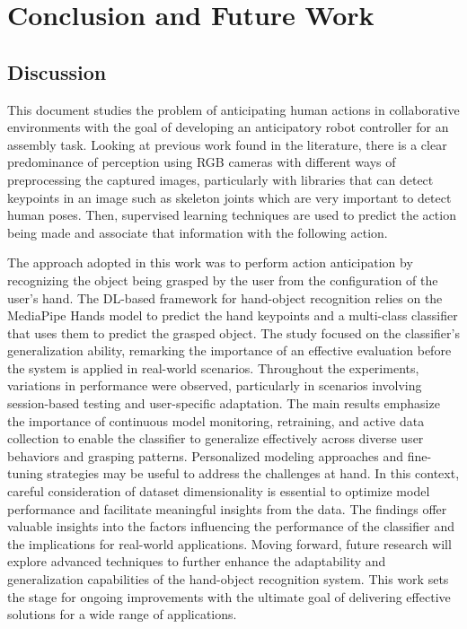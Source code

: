\chapter{Conclusion and Future Work}
\label{chapter:conclusion}

\section{Discussion}

This document studies the problem of anticipating human actions in collaborative environments with the goal of developing an anticipatory robot controller for an assembly task. Looking at previous work found in the literature, there is a clear predominance of perception using RGB cameras with different ways of preprocessing the captured images, particularly with libraries that can detect keypoints in an image such as skeleton joints which are very important to detect human poses. Then, supervised learning techniques are used to predict the action being made and associate that information with the following action.

The approach adopted in this work was to perform action anticipation by recognizing the object being grasped by the user from the configuration of the user's hand. The DL-based framework for hand-object recognition relies on the MediaPipe Hands model to predict the hand keypoints and a multi-class classifier that uses them to predict the grasped object. The study focused on the classifier's generalization ability, remarking the importance of an effective evaluation before the system is applied in real-world scenarios. Throughout the experiments, variations in performance were observed, particularly in scenarios involving session-based testing and user-specific adaptation. The main results emphasize the importance of continuous model monitoring, retraining, and active data collection to enable the classifier to generalize effectively across diverse user behaviors and grasping patterns. Personalized modeling approaches and fine-tuning strategies may be useful to address the challenges at hand. In this context, careful consideration of dataset dimensionality is essential to optimize model performance and facilitate meaningful insights from the data. 
The findings offer valuable insights into the factors influencing the performance of the classifier and the implications for real-world applications. Moving forward, future research will explore advanced techniques to further enhance the adaptability and generalization capabilities of the hand-object recognition system. This work sets the stage for ongoing improvements with the ultimate goal of delivering effective solutions for a wide range of applications.

